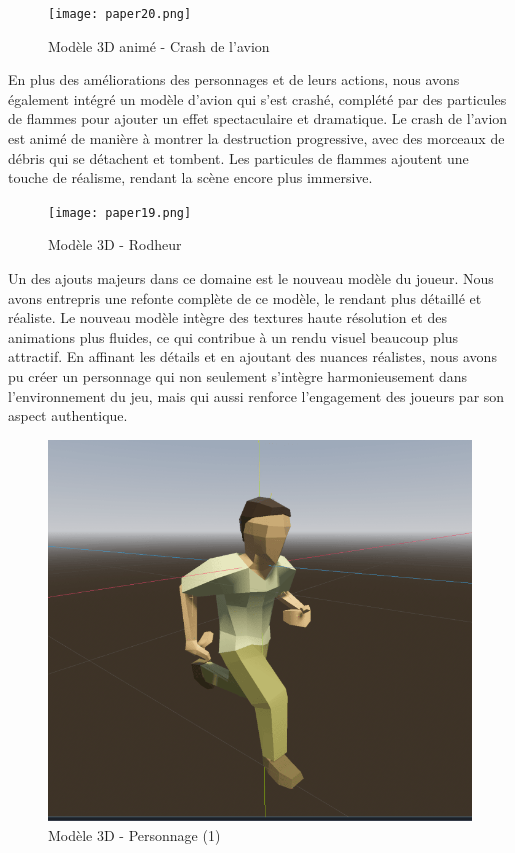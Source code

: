 \documentclass[
	article,			%
	11pt,				%
	oneside,			%
	a4paper,			%
	chapter=TITLE,
	french,			%
	sumario=tradicional
	]{base_nt}
\begin{document}
\begin{figure}[ht]
	\caption{Modèle 3D animé - Crash de l'avion}
	\centering
	\texttt{[image: paper20.png]}
	\legend{}
	
\end{figure}

En plus des améliorations des personnages et de leurs actions, nous avons également intégré un modèle d'avion qui s'est crashé, complété par des particules de flammes pour ajouter un effet spectaculaire et dramatique. Le crash de l'avion est animé de manière à montrer la destruction progressive, avec des morceaux de débris qui se détachent et tombent. Les particules de flammes ajoutent une touche de réalisme, rendant la scène encore plus immersive.

\newpage

\begin{figure}[ht]
	\caption{Modèle 3D - Rodheur}
	\centering
	\texttt{[image: paper19.png]}
	\legend{}
	
\end{figure}

Un des ajouts majeurs dans ce domaine est le nouveau modèle du joueur. Nous avons entrepris une refonte complète de ce modèle, le rendant plus détaillé et réaliste. Le nouveau modèle intègre des textures haute résolution et des animations plus fluides, ce qui contribue à un rendu visuel beaucoup plus attractif. En affinant les détails et en ajoutant des nuances réalistes, nous avons pu créer un personnage qui non seulement s'intègre harmonieusement dans l'environnement du jeu, mais qui aussi renforce l'engagement des joueurs par son aspect authentique.

\newpage

\begin{figure}[ht]
	\caption{Modèle 3D - Personnage (1)}
	\centering
	\includegraphics[width=1\linewidth]{paper17.png}
	\legend{}
	
\end{figure}
\end{document}

